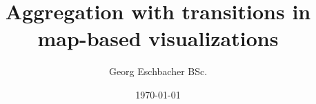 \newcommand{\iauthor}{Georg Eschbacher BSc.}
\newcommand{\isupervisor}{Assist.-Prof. Dipl.-Ing. Dr.techn. Marc Streit}
\newcommand{\imatrikel}{1410695001}
\newcommand{\ititle}{Aggregation with transitions in map-based visualizations}
\newcommand{\ipapertype}{Masterthesis}


\newcommand{\tattainment}{zur Erlangung des akademischen Grades}
\newcommand{\tdegree}{Master of Science}
\newcommand{\tauthor}{VerfasserIn}
\newcommand{\tsubmitted}{Vorgelegt am FH Masterstudiengang MultiMediaTechnology, Fachhochschule Salzburg}
\newcommand{\texamined}{Begutachtet durch}
\newcommand{\tsupervisor}{BetreuerIn}

\title{\ititle}
\author{\iauthor}


\date{\today}